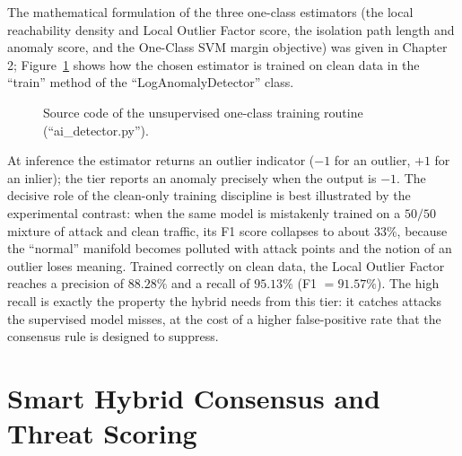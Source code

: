 \documentclass[12pt,a4paper]{report}
\begin{document}
The mathematical formulation of the three one-class estimators (the local
reachability density and Local Outlier Factor score, the isolation path
length and anomaly score, and the One-Class SVM margin objective) was given
in Chapter 2; Figure~\ref{fig:code-lof} shows how the chosen estimator is
trained on clean data in the ``train'' method of the
``LogAnomalyDetector'' class.

\begin{figure}[ht]
  \centering
  \caption{Source code of the unsupervised one-class training routine
           (``ai\_detector.py'').}
  \label{fig:code-lof}
\end{figure}

At inference the estimator returns an outlier indicator ($-1$ for an
outlier, $+1$ for an inlier); the tier reports an anomaly precisely when the
output is $-1$. The decisive role of the clean-only training discipline is
best illustrated by the experimental contrast: when the same model is
mistakenly trained on a $50/50$ mixture of attack and clean traffic, its F1
score collapses to about $33\%$, because the ``normal'' manifold becomes
polluted with attack points and the notion of an outlier loses meaning.
Trained correctly on clean data, the Local Outlier Factor reaches a
precision of $88.28\%$ and a recall of $95.13\%$ (F1 $=91.57\%$). The high
recall is exactly the property the hybrid needs from this tier: it catches
attacks the supervised model misses, at the cost of a higher false-positive
rate that the consensus rule is designed to suppress.

\section{Smart Hybrid Consensus and Threat Scoring}
\label{sec:consensus}
\end{document}

